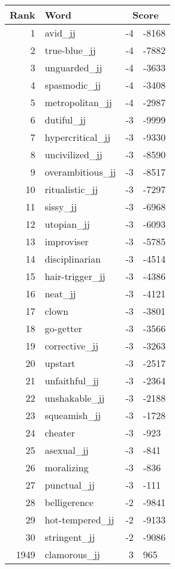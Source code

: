 \begin{longtable}[!htbp]{| rlr@{.}l |}
    \hline
    \textbf{Rank} & \textbf{Word} & \multicolumn{2}{c|}{\textbf{Score}} \\
    \hline
    \endhead
    1 & avid\_jj & -4 & -8168 \\
    2 & true-blue\_jj & -4 & -7882 \\
    3 & unguarded\_jj & -4 & -3633 \\
    4 & spasmodic\_jj & -4 & -3408 \\
    5 & metropolitan\_jj & -4 & -2987 \\
    6 & dutiful\_jj & -3 & -9999 \\
    7 & hypercritical\_jj & -3 & -9330 \\
    8 & uncivilized\_jj & -3 & -8590 \\
    9 & overambitious\_jj & -3 & -8517 \\
    10 & ritualistic\_jj & -3 & -7297 \\
    11 & sissy\_jj & -3 & -6968 \\
    12 & utopian\_jj & -3 & -6093 \\
    13 & improviser & -3 & -5785 \\
    14 & disciplinarian & -3 & -4514 \\
    15 & hair-trigger\_jj & -3 & -4386 \\
    16 & neat\_jj & -3 & -4121 \\
    17 & clown & -3 & -3801 \\
    18 & go-getter & -3 & -3566 \\
    19 & corrective\_jj & -3 & -3263 \\
    20 & upstart & -3 & -2517 \\
    21 & unfaithful\_jj & -3 & -2364 \\
    22 & unshakable\_jj & -3 & -2188 \\
    23 & squeamish\_jj & -3 & -1728 \\
    24 & cheater & -3 & -923 \\
    25 & asexual\_jj & -3 & -841 \\
    26 & moralizing & -3 & -836 \\
    27 & punctual\_jj & -3 & -111 \\
    28 & belligerence & -2 & -9841 \\
    29 & hot-tempered\_jj & -2 & -9133 \\
    30 & stringent\_jj & -2 & -9086 \\
    1949 & clamorous\_jj & 3 & 965 \\

\end{longtable}
